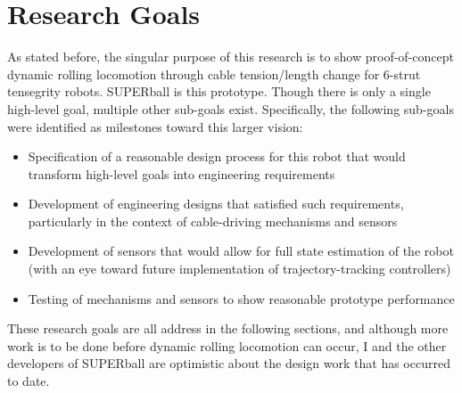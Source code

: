 \documentclass[12pt]{report}
\begin{document}

\section{Research Goals}

As stated before, the singular purpose of this research is to show proof-of-concept dynamic rolling locomotion through cable tension/length change for 6-strut tensegrity robots.
SUPERball is this prototype.
Though there is only a single high-level goal, multiple other sub-goals exist.
Specifically, the following sub-goals were identified as milestones toward this larger vision:

\begin{itemize}
  \setlength{\itemsep}{0cm}%
  \setlength{\parskip}{0cm}%
  \item Specification of a reasonable design process for this robot that would transform high-level goals into engineering requirements
  \item Development of engineering designs that satisfied such requirements, particularly in the context of cable-driving mechanisms and sensors
  \item Development of sensors that would allow for full state estimation of the robot (with an eye toward future implementation of trajectory-tracking controllers)
  \item Testing of mechanisms and sensors to show reasonable prototype performance
\end{itemize}

These research goals are all address in the following sections, and although more work is to be done before dynamic rolling locomotion can occur, I and the other developers of SUPERball are optimistic about the design work that has occurred to date.

\end{document}
